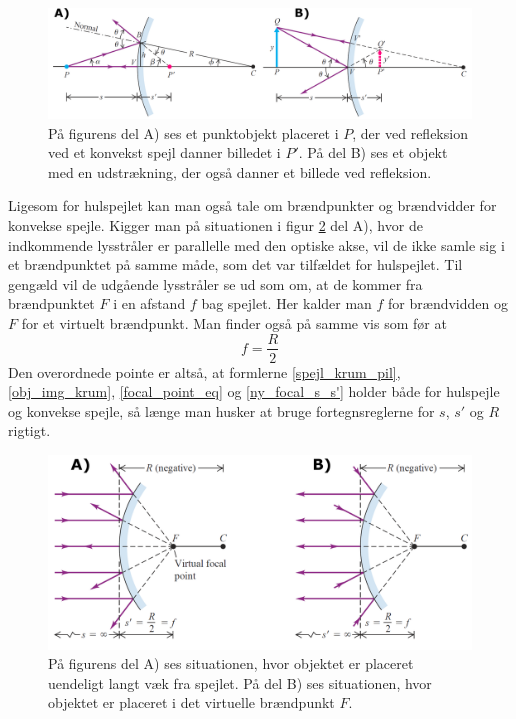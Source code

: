 \begin{figure}[h!]
	\centering
	\includegraphics[scale=0.195]{Geometrisk-Optik/konveks_spejl.PNG}
	\caption{På figurens del A) ses et punktobjekt placeret i $P$, der ved refleksion ved et konvekst spejl danner billedet i $P'$. På del B) ses et objekt med en udstrækning, der også danner et billede ved refleksion.}
	\label{konveks_spejl}
\end{figure}
Ligesom for hulspejlet kan man også tale om brændpunkter og brændvidder for konvekse spejle. Kigger man på situationen i figur \ref{konveks_spejl2} del A), hvor de indkommende lysstråler er parallelle med den optiske akse, vil de ikke samle sig i et brændpunktet på samme måde, som det var tilfældet for hulspejlet. Til gengæld vil de udgående lysstråler se ud som om, at de kommer fra brændpunktet $F$ i en afstand $f$ bag spejlet. Her kalder man $f$ for brændvidden og $F$ for et virtuelt brændpunkt. Man finder også på samme vis som før at 
$$f = \frac{R}{2}$$
Den overordnede pointe er altså, at formlerne \eqref{spejl_krum_pil}, \eqref{obj_img_krum}, \eqref{focal_point_eq} og \eqref{ny_focal_s_s'} holder både for hulspejle og konvekse spejle, så længe man husker at bruge fortegnsreglerne for $s$, $s'$ og $R$ rigtigt.  
\begin{figure}[h!]
	\centering
	\includegraphics[scale=0.23]{Geometrisk-Optik/konveks_spejl2.PNG}
	\caption{På figurens del A) ses situationen, hvor objektet er placeret uendeligt langt væk fra spejlet. På del B) ses situationen, hvor objektet er placeret i det virtuelle brændpunkt $F$.}
	\label{konveks_spejl2}
\end{figure}
